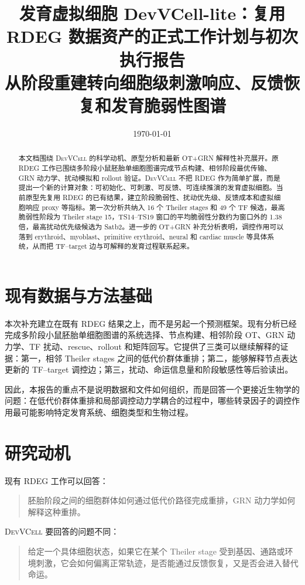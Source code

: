 \documentclass[UTF8,12pt]{ctexart}
\title{\textbf{发育虚拟细胞 DevVCell-lite：复用 RDEG 数据资产的正式工作计划与初次执行报告}\\
\large 从阶段重建转向细胞级刺激响应、反馈恢复和发育脆弱性图谱}
\author{}
\date{\today}
\newcommand{\DevVCell}{\textsc{DevVCell}}
\newcommand{\RDEG}{\textsc{RDEG}}
\newcommand{\OT}{\textsc{OT}}
\newcommand{\GRN}{\textsc{GRN}}
\begin{document}
\maketitle

\begin{abstract}
本文档围绕 \DevVCell{} 的科学动机、原型分析和最新 \OT{}+\GRN{} 解释性补充展开。原 \RDEG{} 工作已围绕多阶段小鼠胚胎单细胞图谱完成节点构建、相邻阶段最优传输、\GRN{} 动力学、扰动模拟和 rollout 验证。\DevVCell{} 不把 \RDEG{} 作为简单扩展，而是提出一个新的计算对象：可初始化、可刺激、可反馈、可连续推演的发育虚拟细胞。当前原型先复用 \RDEG{} 的已有结果，建立阶段脆弱性、扰动优先级、反馈成本和虚拟细胞响应 proxy 等指标。第一次分析共纳入 16 个 Theiler stages 和 49 个 TF 候选，最高脆弱性阶段为 Theiler stage 15，TS14--TS19 窗口的平均脆弱性分数约为窗口外的 1.38 倍，最高扰动优先级候选为 Satb2。进一步的 \OT{}+\GRN{} 补充分析表明，调控作用可以落到 erythroid、myoblast、primitive erythroid、neural 和 cardiac muscle 等具体系统，从而把 TF--target 边与可解释的发育过程联系起来。
\end{abstract}

\section{现有数据与方法基础}

本次补充建立在既有 \RDEG{} 结果之上，而不是另起一个预测框架。现有分析已经完成多阶段小鼠胚胎单细胞图谱的系统选择、节点构建、相邻阶段 \OT{}、\GRN{} 动力学、TF 扰动、rescue、rollout 和矩阵回写。它提供了三类可以继续解释的证据：第一，相邻 Theiler stages 之间的低代价群体重排；第二，能够解释节点表达更新的 TF--target 调控边；第三，扰动、命运信息量和阶段敏感性等后验读出。

因此，本报告的重点不是说明数据和文件如何组织，而是回答一个更接近生物学的问题：在低代价群体重排和局部调控动力学耦合的过程中，哪些转录因子的调控作用最可能影响特定发育系统、细胞类型和生物过程。

\section{研究动机}

现有 \RDEG{} 工作可以回答：

\begin{quote}
胚胎阶段之间的细胞群体如何通过低代价路径完成重排，\GRN{} 动力学如何解释这种重排。
\end{quote}

\DevVCell{} 要回答的问题不同：

\begin{quote}
给定一个具体细胞状态，如果它在某个 Theiler stage 受到基因、通路或环境刺激，它会如何偏离正常轨迹，是否能通过反馈恢复，又是否会进入替代命运。
\end{quote}
\end{document}
